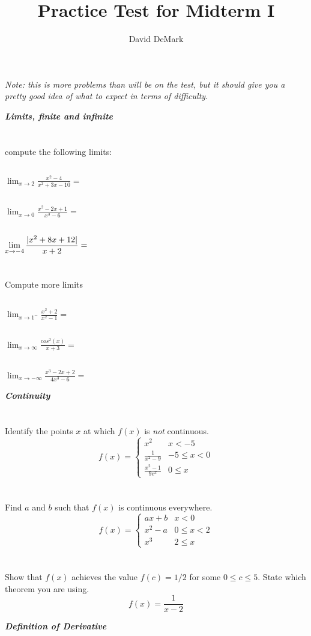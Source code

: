 \documentclass[english]{article}
\title{Practice Test for Midterm I}
\author{David DeMark}
\date{\due}
\DeclarePairedDelimiter\abs{\lvert}{\rvert}%
\newcommand{\prob}[1]{\setcounter{section}{#1-1}\section{}}
\newcommand{\prt}[1]{\setcounter{subsection}{#1-1}\subsection{}}
\theoremstyle{remark}
\theoremstyle{definition}
\begin{document}
	\maketitle
	\emph{Note: this is more problems than will be on the test, but it should give you a pretty good idea of what to expect in terms of difficulty.}
\begin{center}{\LARGE\textbf{\emph{Limits, finite and infinite}}}\end{center}
	\prob{1} compute the following limits:
	\prt{1} $\displaystyle{\lim_{x\to 2} \frac{x^2-4}{x^2+3x-10}=}$\vspace{4cm}
	\prt{2} $\displaystyle{\lim_{x\to 0} \frac{x^2-2x+1}{x^3-6}=}$\vspace{4cm}
	\prt{3} $\displaystyle{\lim_{x\to -4} \frac{\abs{x^2+8x+12}}{x+2}=}$\vspace{4cm}\newpage
	\prob{2} Compute more limits
	\prt{1} $\displaystyle{\lim_{x\to 1^-} \frac{x^2+2}{x^2-1}=}$\vspace{5cm}
	\prt{2}	$\displaystyle{\lim_{x\to \infty} \frac{cos^2(x)}{x+3}=}$\vspace{5cm}
	\prt{3} $\displaystyle{\lim_{x\to -\infty} \frac{x^3-2x+2}{4x^3-6}=}$\vspace{5cm}\newpage
	\begin{center}{\LARGE\textbf{\emph{Continuity}}}\end{center}
	\prob{3} Identify the points $x$ at which $f(x)$ is \emph{not} continuous.
	\begin{equation*} f(x)=\begin{cases}
x^2&x<-5\\
\frac{1}{x^2-9}&-5\leq x<0\\
\frac{x^2-1}{9e^x}& 0\leq x 
	\end{cases}
	\end{equation*}
	\vspace{4cm}
	\prob{4} Find $a$ and $b$ such that $f(x)$ is continuous everywhere.
	\begin{equation*}
	f(x)=\begin{cases}
	ax+b&x<0\\
	x^2-a &0\leq x <2\\
	x^3 & 2\leq x
	\end{cases}
	\end{equation*}\vspace{4.5cm}
	\prob{5} Show that $f(x)$ achieves the value $f(c)=1/2$ for some $0\leq c \leq 5$. State which theorem you are using.
	$$f(x)=\frac{1}{x-2}$$\vspace{6cm}
	\begin{center}{\LARGE\textbf{\emph{Definition of Derivative}}}\end{center}
\end{document}
